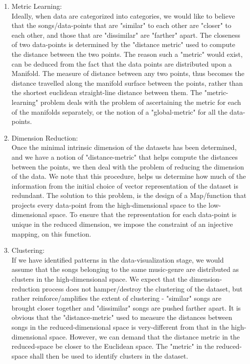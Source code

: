 \documentclass[12pt]{article}
\begin{document}
\begin{enumerate}
\item Metric Learning:\\
Ideally, when data are categorized into categories, we would like to believe that the songs/data-points that are "similar" to each other are "closer" to each other, and those that are "dissimilar" are "farther" apart. The closeness of two data-points is determined by the "distance metric" used to compute the distance between the two points. The reason such a "metric" would exist, can be deduced from the fact that the data points are distributed upon a Manifold. The measure of distance between any two points, thus becomes the distance travelled along the manifold surface between the points, rather than the shortest euclidean straight-line distance between them. The "metric-learning" problem deals with the problem of ascertaining the metric for each of the manifolds separately, or the notion of a "global-metric" for all the data-points.

\item Dimension Reduction:\\
Once the minimal intrinsic dimension of the datasets has been determined, and we have a notion of "distance-metric" that helps compute the distances between the points, we then deal with the problem of reducing the dimension of the data. We note that this procedure, helps us determine how much of the information from the initial choice of vector representation of the dataset is redundant. The solution to this problem, is the design of a Map/function that projects every data-point from the high-dimensional space to the low-dimensional space. To ensure that the representation for each data-point is unique in the reduced dimension, we impose the constraint of an injective mapping, on this function. 


\item Clustering:\\
If we have identified patterns in the data-visualization stage, we would assume that the songs belonging to the same music-genre are distributed as clusters in the high-dimensional space. We expect that the dimension-reduction process does not hamper/destroy the clustering of the dataset, but rather reinforce/amplifies the extent of clustering - "similar" songs are brought closer together and "dissimilar" songs are pushed farther apart. It is obvious that the "distance-metric" used to measure the distances between songs in the reduced-dimensional space is very-different from that in the high-dimensional space. However, we can demand that the distance metric in the reduced-space be closer to the Euclidean space. The "metric" in the reduced-space shall then be used to identify clusters in the dataset. 


\end{enumerate}
\end{document}
